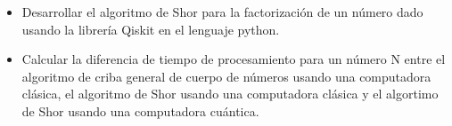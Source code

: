 \begin{itemize}
    \item Desarrollar el algoritmo de Shor para la factorización de un número dado usando la librería Qiskit en el lenguaje python.
    \item Calcular la diferencia de tiempo de procesamiento para un número N entre el algoritmo de criba general de cuerpo de números 
    usando una computadora clásica, el algoritmo de Shor usando una computadora clásica y el algortimo de Shor usando una computadora cuántica.
\end{itemize}
